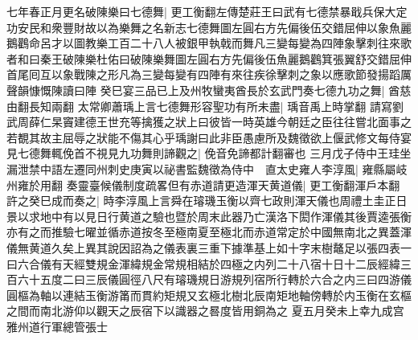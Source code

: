 七年春正月更名破陳樂曰七德舞|{
	更工衡翻左傳楚莊王曰武有七德禁暴戢兵保大定功安民和衆豐財故以為樂舞之名新志七德舞圖左圓右方先偏後伍交錯屈伸以象魚麗鵝鸛命呂才以圖教樂工百二十八人被銀甲執戟而舞凡三變每變為四陣象擊刺往來歌者和曰秦王破陳樂杜佑曰破陳樂舞圖左圓右方先偏後伍魚麗鵝鸛箕張翼舒交錯屈伸首尾囘互以象戰陳之形凡為三變每變有四陣有來往疾徐擊刺之象以應歌節發揚蹈厲聲韻慷慨陳讀曰陣}
癸巳宴三品已上及州牧蠻夷酋長於玄武門奏七德九功之舞|{
	酋慈由翻長知兩翻}
太常卿蕭瑀上言七德舞形容聖功有所未盡|{
	瑀音禹上時掌翻}
請寫劉武周薛仁杲竇建德王世充等擒獲之狀上曰彼皆一時英雄今朝廷之臣往往嘗北面事之若覩其故主屈辱之狀能不傷其心乎瑀謝曰此非臣愚慮所及魏徵欲上偃武修文每侍宴見七德舞輒俛首不視見九功舞則諦觀之|{
	俛音免諦都計翻審也}
三月戊子侍中王珪坐漏泄禁中語左遷同州刺史庚寅以祕書監魏徵為侍中　直太史雍人李淳風|{
	雍縣屬岐州雍於用翻}
奏靈臺候儀制度疏畧但有赤道請更造渾天黄道儀|{
	更工衡翻渾戶本翻}
許之癸巳成而奏之|{
	時李淳風上言舜在璿璣玉衡以齊七政則渾天儀也周禮土圭正日景以求地中有以見日行黄道之驗也暨於周末此器乃亡漢洛下閎作渾儀其後賈逵張衡亦有之而推驗七曜並循赤道按冬至極南夏至極北而赤道常定於中國無南北之異蓋渾儀無黄道久矣上異其說因詔為之儀表裏三重下據準基上如十字末樹鼇足以張四表一曰六合儀有天經雙規金渾緯規金常規相結於四極之内列二十八宿十日十二辰經緯三百六十五度二曰三辰儀圓徑八尺有璿璣規日游規列宿所行轉於六合之内三曰四游儀圓樞為軸以連結玉衡游筩而貫約矩規又玄極北樹北辰南矩地軸傍轉於内玉衡在玄樞之間而南北游仰以觀天之辰宿下以識器之晷度皆用銅為之}
夏五月癸未上幸九成宫　雅州道行軍總管張士

